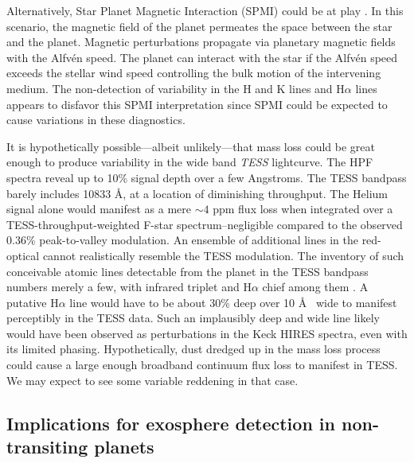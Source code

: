 \documentclass[linenumbers, twocolumn, trackchanges]{aastex631}
\begin{document}
Alternatively, Star Planet Magnetic Interaction (SPMI) could be at play \citep{2018haex.bookE..25S}.  In this scenario, the magnetic field of the planet permeates the space between the star and the planet.  Magnetic perturbations propagate via planetary magnetic fields with the Alfv\'en speed.  The planet can interact with the star if the Alfv\'en speed exceeds the stellar wind speed controlling the bulk motion of the intervening medium.  The non-detection of variability in the  H and K lines and H$\alpha$ lines appears to disfavor this SPMI interpretation since SPMI could be expected to cause variations in these diagnostics.

It is hypothetically possible---albeit unlikely---that mass loss could be great enough to produce variability in the wide band \emph{TESS} lightcurve.  The HPF spectra reveal up to 10\% signal depth over a few Angstroms.  The TESS bandpass barely includes 10833 \AA, at a location of diminishing throughput.  The Helium signal alone would manifest as a mere $\sim4$ ppm flux loss when integrated over a TESS-throughput-weighted F-star spectrum--negligible compared to the observed $0.36\%$ peak-to-valley modulation.  An ensemble of additional lines in the red-optical cannot realistically resemble the TESS modulation.  The inventory of such conceivable atomic lines detectable from the planet in the TESS bandpass numbers merely a few, with  infrared triplet and H$\alpha$ chief among them \citep{2023arXiv230606971L}.   A putative H$\alpha$ line would have to be about 30\% deep over 10 \AA~ wide to manifest perceptibly in the TESS data.  Such an implausibly deep and wide line likely would have been observed as perturbations in the Keck HIRES spectra, even with its limited phasing.  Hypothetically, dust dredged up in the mass loss process could cause a large enough broadband continuum flux loss to manifest in TESS.  We may expect to see some variable reddening in that case.

\subsection{Implications for exosphere detection in non-transiting planets}
\end{document}
